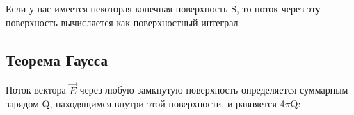 Если у нас имеется некоторая конечная поверхность S, то поток
через эту поверхность вычисляется как поверхностный интеграл


\subsection*{Теорема Гаусса}

Поток вектора $\vec{E}$ через любую замкнутую
поверхность определяется суммарным зарядом Q, находящимся внутри этой
поверхности, и равняется 4$\pi$Q:





